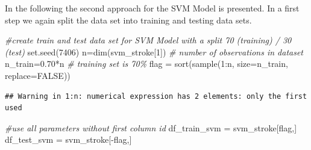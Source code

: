 \documentclass[
]{article}
\newenvironment{Shaded}{\begin{snugshade}}{\end{snugshade}}
\newcommand{\AttributeTok}[1]{\textcolor[rgb]{0.77,0.63,0.00}{#1}}
\newcommand{\CommentTok}[1]{\textcolor[rgb]{0.56,0.35,0.01}{\textit{#1}}}
\newcommand{\ConstantTok}[1]{\textcolor[rgb]{0.00,0.00,0.00}{#1}}
\newcommand{\DecValTok}[1]{\textcolor[rgb]{0.00,0.00,0.81}{#1}}
\newcommand{\FloatTok}[1]{\textcolor[rgb]{0.00,0.00,0.81}{#1}}
\newcommand{\FunctionTok}[1]{\textcolor[rgb]{0.00,0.00,0.00}{#1}}
\newcommand{\NormalTok}[1]{#1}
\newcommand{\OtherTok}[1]{\textcolor[rgb]{0.56,0.35,0.01}{#1}}
\newcommand{\SpecialCharTok}[1]{\textcolor[rgb]{0.00,0.00,0.00}{#1}}
\renewcommand{\=}[1]{\stackrel{#1}{=}}
\theoremstyle{definition}
\theoremstyle{remark}
\begin{document}
\newpage

In the following the second approach for the SVM Model is presented. In a first step we again split the data set into training and testing data sets.

\begin{Shaded}
\begin{Highlighting}[]
\CommentTok{\#create train and test data set for SVM Model with a split 70 (training) / 30 (test) }
\FunctionTok{set.seed}\NormalTok{(}\DecValTok{7406}\NormalTok{)}
\NormalTok{n}\OtherTok{=}\FunctionTok{dim}\NormalTok{(svm\_stroke[}\DecValTok{1}\NormalTok{])  }\CommentTok{\# number of observations in dataset}
\NormalTok{n\_train}\OtherTok{=}\FloatTok{0.70}\SpecialCharTok{*}\NormalTok{n  }\CommentTok{\# training set is 70\%}
\NormalTok{flag }\OtherTok{=} \FunctionTok{sort}\NormalTok{(}\FunctionTok{sample}\NormalTok{(}\DecValTok{1}\SpecialCharTok{:}\NormalTok{n, }\AttributeTok{size=}\NormalTok{n\_train, }\AttributeTok{replace=}\ConstantTok{FALSE}\NormalTok{))}
\end{Highlighting}
\end{Shaded}

\begin{verbatim}
## Warning in 1:n: numerical expression has 2 elements: only the first used
\end{verbatim}

\begin{Shaded}
\begin{Highlighting}[]
\CommentTok{\#use all parameters without first column id}
\NormalTok{df\_train\_svm }\OtherTok{=}\NormalTok{ svm\_stroke[flag,]}
\NormalTok{df\_test\_svm }\OtherTok{=}\NormalTok{ svm\_stroke[}\SpecialCharTok{{-}}\NormalTok{flag,]}
\end{Highlighting}
\end{Shaded}

\begin{Shaded}
\end{Shaded}

\begin{Shaded}
\end{Shaded}
\end{document}
